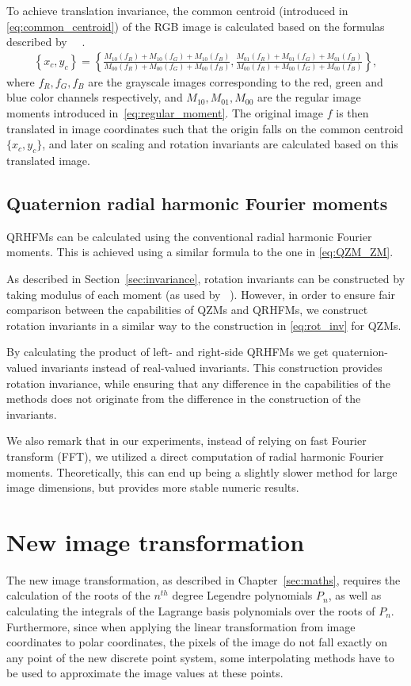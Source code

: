To achieve translation invariance, the common centroid (introduced in \eqref{eq:common_centroid}) of the RGB image is calculated based on the formulas described by ~\citeauthor{affine_color}~\cite{affine_color}.
\begin{gather*}
    \left\{x_c,y_c\right\} = \left\{\frac{M_{10}(f_R)+M_{10}(f_G)+M_{10}(f_B)}{M_{00}(f_R)+M_{00}(f_G)+M_{00}(f_B)}, \frac{M_{01}(f_R)+M_{01}(f_G)+M_{01}(f_B)}{M_{00}(f_R)+M_{00}(f_G)+M_{00}(f_B)}\right\},
\end{gather*}
where $f_R, f_G, f_B$ are the grayscale images corresponding to the red, green and blue color channels respectively, and $M_{10}, M_{01}, M_{00}$ are the regular image moments introduced in~\eqref{eq:regular_moment}.
The original image $f$ is then translated in image coordinates such that the origin falls on the common centroid $\{x_c,y_c\}$, and later on scaling and rotation invariants are calculated based on this translated image.


\subsection{Quaternion radial harmonic Fourier moments}
QRHFMs can be calculated using the conventional radial harmonic Fourier moments. This is achieved using a similar formula to the one in \eqref{eq:QZM_ZM}.

As described in Section~\ref{sec:invariance}, rotation invariants can be constructed by taking modulus of each moment (as used by \citeauthor{LiuAcc}~\cite{LiuAcc}).
However, in order to ensure fair comparison between the capabilities of QZMs and QRHFMs, we construct rotation invariants in a similar way to the construction in \eqref{eq:rot_inv} for QZMs.

By calculating the product of left- and right-side QRHFMs we get quaternion-valued invariants instead of real-valued invariants. This construction provides rotation invariance, while ensuring that any difference in the capabilities of the methods does not originate from the difference in the construction of the invariants.

We also remark that in our experiments, instead of relying on fast Fourier transform (FFT), we utilized a direct computation of radial harmonic Fourier moments. Theoretically, this can end up being a slightly slower method for large image dimensions, but provides more stable numeric results.

\section{New image transformation}\label{sec:new_trans}
The new image transformation, as described in Chapter~\ref{sec:maths}, requires the calculation of the roots of the $n^{th}$ degree Legendre polynomials $P_n$, as well as calculating the integrals of the Lagrange basis polynomials over the roots of $P_n$. Furthermore, since when applying the linear transformation from image coordinates to polar coordinates, the pixels of the image do not fall exactly on any point of the new discrete point system, some interpolating methods have to be used to approximate the image values at these points.

